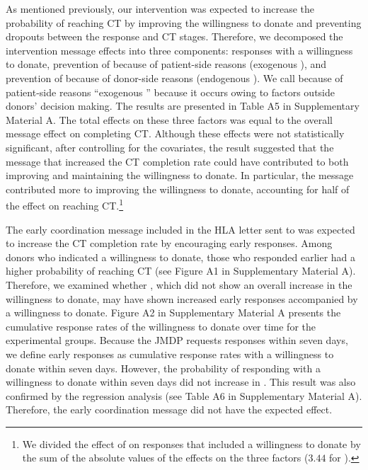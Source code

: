 \documentclass[12pt, a4paper]{article}
\newcommand{\revise}[1]{{\color{red}{#1}}}
\begin{document}
As mentioned previously, our intervention was expected to increase the probability of reaching CT by improving the willingness to donate and preventing dropouts between the response and CT stages. Therefore, we decomposed the intervention message effects into three components: responses with a willingness to donate, prevention of \revise{dropout} because of patient-side reasons (exogenous \revise{dropout}), and prevention of \revise{dropout} because of donor-side reasons (endogenous \revise{dropout}). We call \revise{dropout} because of patient-side reasons ``exogenous \revise{dropout}'' because it occurs owing to factors outside donors' decision making. The results are presented in Table A5 in Supplementary Material A. The total effects on these three factors was equal to the overall message effect on completing CT. Although these effects were not statistically significant, after controlling for the covariates, the result suggested that the \revise{matching difficulty} message that increased the CT completion rate could have contributed to both improving and maintaining the willingness to donate. In particular, the \revise{matching difficulty} message contributed more to improving the willingness to donate, accounting for half of the effect on reaching CT.\footnote{We divided the effect of \revise{the MatchMessage group} on responses that included a willingness to donate by the sum of the absolute values of the effects on the three factors (\(3.44\) for \revise{the MatchMessage group}).}

The early coordination message included in the HLA letter sent to \revise{the CoordMessage group} was expected to increase the CT completion rate by encouraging early responses. Among donors who indicated a willingness to donate, those who responded earlier had a higher probability of reaching CT (see Figure A1 in Supplementary Material A). Therefore, we examined whether \revise{the CoordMessage group}, which did not show an overall increase in the willingness to donate, may have shown increased early responses accompanied by a willingness to donate. Figure A2 in Supplementary Material A presents the cumulative response rates of the willingness to donate over time for the experimental groups. Because the JMDP requests responses within seven days, we define early responses as cumulative response rates with a willingness to donate within seven days. However, the probability of responding with a willingness to donate within seven days did not increase in \revise{the CoordMessage group}. This result was also confirmed by the regression analysis (see Table A6 in Supplementary Material A). Therefore, the early coordination message did not have the expected effect.
\end{document}
